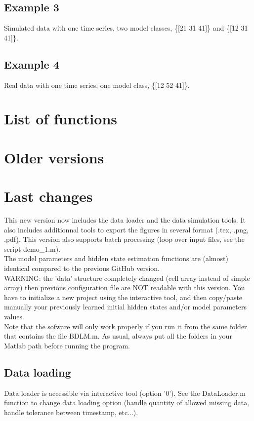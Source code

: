 \documentclass{book}
\begin{document}
\section{Example 3}
Simulated data with one time series, two model classes, \{[21 31 41]\} and \{[12 31 41]\}.

\section{Example 4}
Real data with one time series, one model class, \{[12 52 41]\}.

\newpage

\chapter{List of functions}
\newpage


\chapter{Older versions}
\newpage

\chapter{Last changes}

This new version now includes the data loader and the data simulation tools.
It also includes additionnal tools to export the figures in several format (.tex, .png, .pdf).
This version also supports batch processing (loop over input files, see the script demo\_1.m). \\

The model parameters and hidden state estimation functions are (almost) identical compared to the previous GitHub version.\\

WARNING: the 'data' structure completely changed (cell array instead of simple array) then previous configuration file are NOT readable with this version. You have to initialize a new project using the interactive tool, and then copy/paste manually your previously learned initial hidden states and/or model parameters values.\\

Note that the sofware will only work properly if you run it from the same folder that contains the file BDLM.m.
As usual, always put all the folders in your Matlab path before running the program.

\section{Data loading}
Data loader is accessible via interactive tool (option '0').
See the DataLoader.m function to change data loading option (handle quantity of allowed missing data, handle tolerance between timestamp, etc...).
\end{document}
